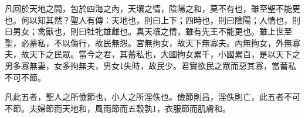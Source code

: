\begin{pinyinscope}
凡回於天地之間，包於四海之內，天壤之情，陰陽之和，莫不有也，雖至聖不能更也。何以知其然？聖人有傳：天地也，則曰上下；四時也，則曰陰陽；人情也，則曰男女；禽獸也，則曰牡牝雄雌也。真天壤之情，雖有先王不能更也。雖上世至聖，必蓄私，不以傷行，故民無怨。宮無拘女，故天下無寡夫。內無拘女，外無寡夫，故天下之民眾。當今之君，其蓄私也，大國拘女累千，小國累百，是以天下之男多寡無妻，女多拘無夫，男女1失時，故民少。君實欲民之眾而惡其寡，當蓄私不可不節。

凡此五者，聖人之所儉節也，小人之所淫佚也。儉節則昌，淫佚則亡，此五者不可不節。夫婦節而天地和，風雨節而五穀孰1，衣服節而肌膚和。


\end{pinyinscope}
